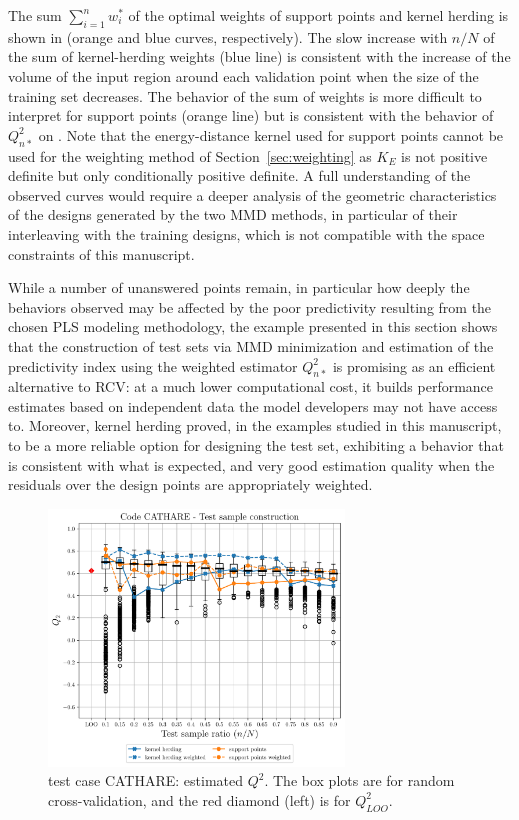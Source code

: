 The sum $\sum_{i=1}^n w_i^*$ of the optimal weights of support points and kernel herding  is shown in  (orange and blue curves, respectively). 
The slow increase with $n/N$ of the sum of kernel-herding weights (blue line) is consistent with the increase of the volume of the input region around each validation point when the size of the training set decreases. 
The behavior of the sum of weights is more difficult to interpret for support points (orange line) but is consistent with the behavior of $Q_{n*}^2$ on . 
Note that the energy-distance kernel  used for support points cannot be used for the weighting method of Section~\ref{sec:weighting} as $K_E$ is not positive definite but only conditionally positive definite. 
A full understanding of the observed curves would require a deeper analysis of the geometric characteristics of the designs generated by the two MMD methods, in particular of their interleaving with the training designs, which is not compatible with the space constraints of this manuscript. 

While a number of unanswered points remain, in particular how deeply the behaviors observed may be affected by the poor predictivity resulting from the chosen PLS modeling methodology, the example presented in this section shows that the construction of test sets via MMD minimization and estimation of the predictivity index using the weighted estimator $Q_{n*}^2$ is promising as an efficient alternative to RCV: at a much lower computational cost, it builds performance estimates based on independent data the model developers may not have access to. 
Moreover, kernel herding proved, in the examples studied in this manuscript, to be a more reliable option for designing the test set, exhibiting a behavior that is consistent with what is expected, and very good estimation quality when the residuals over the design points are appropriately weighted.

\begin{figure}
  \centering
  \includegraphics[width=0.7\textwidth]{./part2/figures/SIS/cathareC2.pdf}
  \caption{test case CATHARE: estimated $Q^2$. The box plots are for random cross-validation, and the red diamond (left) is for $Q^2_{LOO}$.}
  \label{fig:cathareC2_benchmark}
\end{figure}

